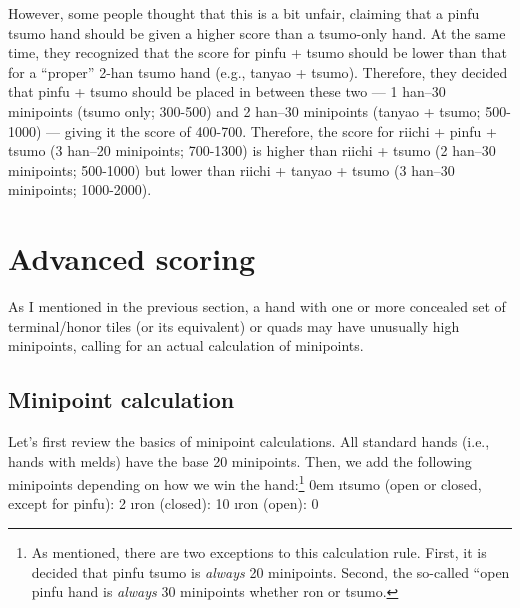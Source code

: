 \begin{boxnote}
%
%
\qquad However, some people thought that this is a bit unfair, claiming that a {\jap pinfu tsumo} hand should be given a higher score than a {\jap tsumo}-only hand. At the same time, they recognized that the score for {\jap pinfu + tsumo} should be lower than that for a ``proper'' 2-{\jap han} {\jap tsumo} hand (e.g., {\jap tanyao + tsumo}). 
Therefore, they decided that {\jap pinfu + tsumo} should be placed in between these two --- 1 {\jap han}--30 minipoints ({\jap tsumo} only; 300-500) and 2 {\jap han}--30 minipoints ({\jap tanyao + tsumo}; 500-1000) --- giving it the score of 400-700. Therefore, the score for riichi + {\jap pinfu + tsumo} (3 {\jap han}--20 minipoints; 700-1300) is higher than riichi + {\jap tsumo} (2 {\jap han}--30 minipoints; 500-1000) but lower than riichi + {\jap tanyao + tsumo} (3 {\jap han}--30 minipoints; 1000-2000). 
\end{boxnote}

\newpage

\section{Advanced scoring} \label{sec:scores2}

As I mentioned in the previous section, a hand with one or more concealed set of terminal/honor tiles (or its equivalent) or quads may have unusually high minipoints, calling for an actual calculation of minipoints. 

\bigskip
\subsection{Minipoint calculation}
	 
Let's first review the basics of minipoint calculations. 
All standard hands (i.e., hands with melds) have the base 20 minipoints. Then, we add the following minipoints depending on how we win the hand:\footnote{As mentioned, there are two exceptions to this calculation rule. First, it is decided that {\jap pinfu} {\jap tsumo} is \emph{always} 20 minipoints. Second, the so-called ``open {\jap pinfu} hand is \emph{always} 30 minipoints whether {\jap ron} or {\jap tsumo}.}
\bi \itemsep0em
\i {\jap tsumo} (open or closed, except for {\jap pinfu}): 2
\i {\jap ron} (closed): 10
\i {\jap ron} (open): 0
\ei 

